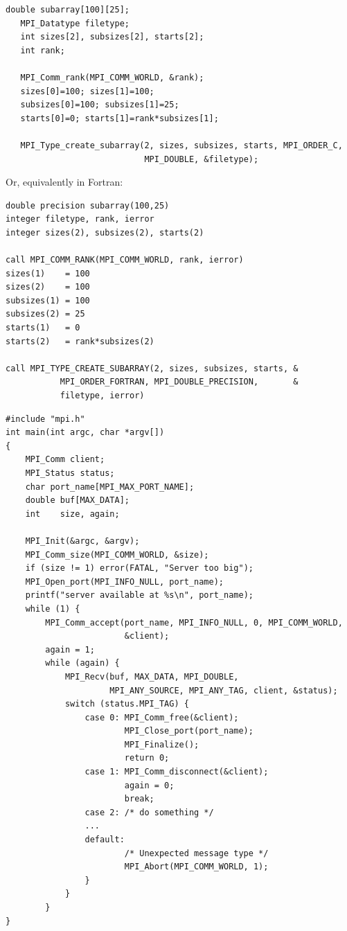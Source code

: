 \begin{example}
%
\begin{lstlisting}[language={[MPI]C}]
   double subarray[100][25];
   MPI_Datatype filetype;
   int sizes[2], subsizes[2], starts[2];
   int rank;

   MPI_Comm_rank(MPI_COMM_WORLD, &rank);
   sizes[0]=100; sizes[1]=100;
   subsizes[0]=100; subsizes[1]=25;
   starts[0]=0; starts[1]=rank*subsizes[1];

   MPI_Type_create_subarray(2, sizes, subsizes, starts, MPI_ORDER_C,
                            MPI_DOUBLE, &filetype);
\end{lstlisting}

Or, equivalently in Fortran:

\begin{lstlisting}[language={[MPI]Fortran}]
double precision subarray(100,25)
integer filetype, rank, ierror
integer sizes(2), subsizes(2), starts(2)

call MPI_COMM_RANK(MPI_COMM_WORLD, rank, ierror)
sizes(1)    = 100
sizes(2)    = 100
subsizes(1) = 100
subsizes(2) = 25
starts(1)   = 0
starts(2)   = rank*subsizes(2)

call MPI_TYPE_CREATE_SUBARRAY(2, sizes, subsizes, starts, &
           MPI_ORDER_FORTRAN, MPI_DOUBLE_PRECISION,       &
           filetype, ierror)
\end{lstlisting}

\begin{lstlisting}[language={[MPI]C}]
#include "mpi.h"
int main(int argc, char *argv[])
{
    MPI_Comm client;
    MPI_Status status;
    char port_name[MPI_MAX_PORT_NAME];
    double buf[MAX_DATA];
    int    size, again;

    MPI_Init(&argc, &argv);
    MPI_Comm_size(MPI_COMM_WORLD, &size);
    if (size != 1) error(FATAL, "Server too big");
    MPI_Open_port(MPI_INFO_NULL, port_name);
    printf("server available at %s\n", port_name);
    while (1) {
        MPI_Comm_accept(port_name, MPI_INFO_NULL, 0, MPI_COMM_WORLD, 
                        &client);
        again = 1;
        while (again) {
            MPI_Recv(buf, MAX_DATA, MPI_DOUBLE, 
                     MPI_ANY_SOURCE, MPI_ANY_TAG, client, &status);
            switch (status.MPI_TAG) {
                case 0: MPI_Comm_free(&client);
                        MPI_Close_port(port_name);
                        MPI_Finalize();
                        return 0;
                case 1: MPI_Comm_disconnect(&client);
                        again = 0;
                        break;
                case 2: /* do something */
                ...
                default:
                        /* Unexpected message type */
                        MPI_Abort(MPI_COMM_WORLD, 1);
                }
            }
        }
}
\end{lstlisting}


\end{example}
